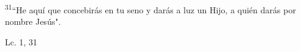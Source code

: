 \documentclass[../../rosario.tex]{subfiles}
\begin{document}
    \textsuperscript{31}``He aquí que concebirás en tu seno y darás a luz un Hijo, a quién darás por nombre Jesús".
    \begin{flushright}
    Lc. 1, 31
    \end{flushright}
\end{document}
